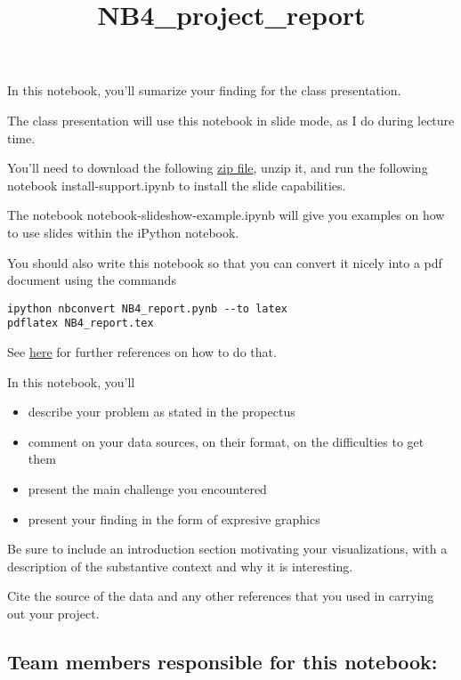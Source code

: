 \documentclass{article}
\title{NB4\_project\_report}
\begin{document}
    
    
    \maketitle
    
    

    
    In this notebook, you'll sumarize your finding for the class
presentation.

The class presentation will use this notebook in slide mode, as I do
during lecture time.

You'll need to download the following
\href{https://github.com/fperez/nb-slideshow-template/archive/master.zip}{zip
file}, unzip it, and run the following notebook install-support.ipynb to
install the slide capabilities.

The notebook notebook-slideshow-example.ipynb will give you examples on
how to use slides within the iPython notebook.

You should also write this notebook so that you can convert it nicely
into a pdf document using the commands

\begin{verbatim}
ipython nbconvert NB4_report.pynb --to latex
pdflatex NB4_report.tex
\end{verbatim}

See
\href{http://ipython.org/ipython-doc/rel-1.0.0/interactive/nbconvert.html}{here}
for further references on how to do that.

In this notebook, you'll

\begin{itemize}
\item
  describe your problem as stated in the propectus
\item
  comment on your data sources, on their format, on the difficulties to
  get them
\item
  present the main challenge you encountered
\item
  present your finding in the form of expresive graphics
\end{itemize}

Be sure to include an introduction section motivating your
visualizations, with a description of the substantive context and why it
is interesting.

Cite the source of the data and any other references that you used in
carrying out your project.

    \subsection{Team members responsible for this
notebook:}\label{team-members-responsible-for-this-notebook}
\end{document}
